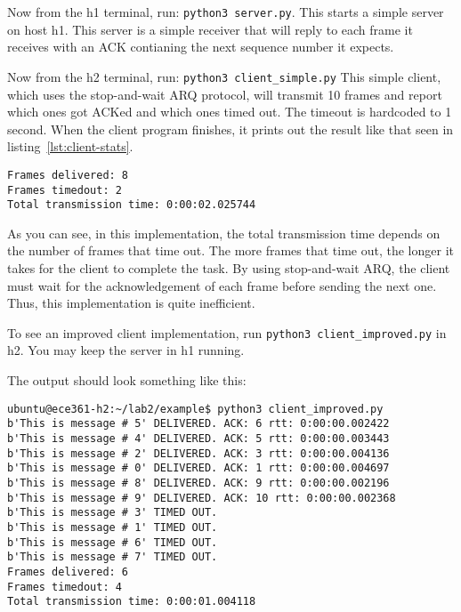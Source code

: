 \documentclass[11pt]{article}
\begin{document}
Now from the h1 terminal, run: \texttt{python3 server.py}.
This starts a simple server on host h1. This server is a simple receiver that will reply to each frame it receives with an ACK contianing the next sequence number it expects.

Now from the h2 terminal, run: \texttt{python3 client\_simple.py}
This simple client, which uses the stop-and-wait ARQ protocol, will transmit 10 frames and report which ones got ACKed and which ones timed out.
The timeout is hardcoded to 1 second. When the client program finishes, it prints out the result like that seen in listing~\ref{lst:client-stats}.
\begin{lstlisting}[style=ece361shell, caption={}, label={lst:client-stats}]
Frames delivered: 8
Frames timedout: 2
Total transmission time: 0:00:02.025744
\end{lstlisting}

As you can see, in this implementation, the total transmission time depends on the number of frames that time out.
The more frames that time out, the longer it takes for the client to complete the task.
By using stop-and-wait ARQ, the client must wait for the acknowledgement of each frame before sending the next one.
Thus, this implementation is quite inefficient.

To see an improved client implementation, run \texttt{python3 client\_improved.py} in h2. You may keep the server in h1 running.

The output should look something like this:
\begin{lstlisting}[style=ece361shell, caption={}]
ubuntu@ece361-h2:~/lab2/example$ python3 client_improved.py
b'This is message # 5' DELIVERED. ACK: 6 rtt: 0:00:00.002422
b'This is message # 4' DELIVERED. ACK: 5 rtt: 0:00:00.003443
b'This is message # 2' DELIVERED. ACK: 3 rtt: 0:00:00.004136
b'This is message # 0' DELIVERED. ACK: 1 rtt: 0:00:00.004697
b'This is message # 8' DELIVERED. ACK: 9 rtt: 0:00:00.002196
b'This is message # 9' DELIVERED. ACK: 10 rtt: 0:00:00.002368
b'This is message # 3' TIMED OUT.
b'This is message # 1' TIMED OUT.
b'This is message # 6' TIMED OUT.
b'This is message # 7' TIMED OUT.
Frames delivered: 6
Frames timedout: 4
Total transmission time: 0:00:01.004118
\end{lstlisting}
\end{document}
